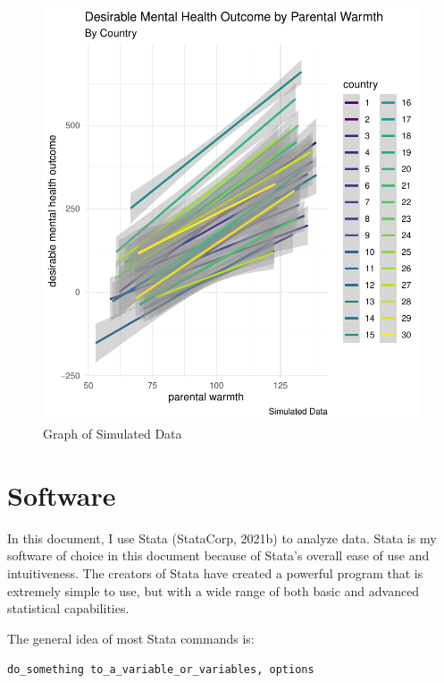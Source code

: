 \documentclass[
  letterpaper,
  DIV=11,
  numbers=noendperiod]{scrreprt}
\begin{document}
\begin{figure}

{\centering \includegraphics{./simulated-multi-country-data_files/figure-pdf/fig-data-1.pdf}

}

\caption{\label{fig-data}Graph of Simulated Data}

\end{figure}


\hypertarget{sec-software}{%
\chapter{Software}\label{sec-software}}

In this document, I use Stata (StataCorp, 2021b) to analyze data. Stata
is my software of choice in this document because of Stata's overall
ease of use and intuitiveness. The creators of Stata have created a
powerful program that is extremely simple to use, but with a wide range
of both basic and advanced statistical capabilities.

The general idea of most Stata commands is:

\texttt{do\_something\ to\_a\_variable\_or\_variables,\ options}
\end{document}
